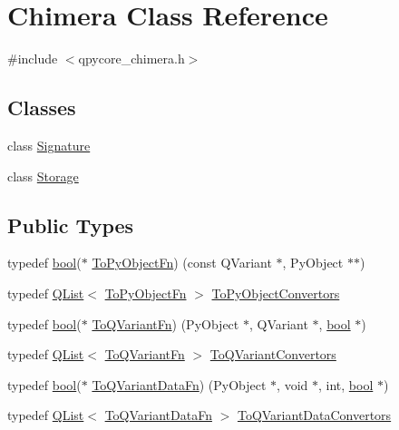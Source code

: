 \hypertarget{classChimera}{}\section{Chimera Class Reference}
\label{classChimera}


{\ttfamily \#include $<$qpycore\+\_\+chimera.\+h$>$}

\subsection*{Classes}
\begin{DoxyCompactItemize}
\item 
class \hyperlink{classChimera_1_1Signature}{Signature}
\item 
class \hyperlink{classChimera_1_1Storage}{Storage}
\end{DoxyCompactItemize}
\subsection*{Public Types}
\begin{DoxyCompactItemize}
\item 
typedef \hyperlink{compiler_8h_abb452686968e48b67397da5f97445f5b}{bool}($\ast$ \hyperlink{classChimera_a056918a401ce0fb2fc5f0b46a8eb6967}{To\+Py\+Object\+Fn}) (const Q\+Variant $\ast$, Py\+Object $\ast$$\ast$)
\item 
typedef \hyperlink{classQList}{Q\+List}$<$ \hyperlink{classChimera_a056918a401ce0fb2fc5f0b46a8eb6967}{To\+Py\+Object\+Fn} $>$ \hyperlink{classChimera_a2ee1210a664f0d28e5220b5055c8386a}{To\+Py\+Object\+Convertors}
\item 
typedef \hyperlink{compiler_8h_abb452686968e48b67397da5f97445f5b}{bool}($\ast$ \hyperlink{classChimera_aace3d67d11685db3bae5e5b2ee733cfb}{To\+Q\+Variant\+Fn}) (Py\+Object $\ast$, Q\+Variant $\ast$, \hyperlink{compiler_8h_abb452686968e48b67397da5f97445f5b}{bool} $\ast$)
\item 
typedef \hyperlink{classQList}{Q\+List}$<$ \hyperlink{classChimera_aace3d67d11685db3bae5e5b2ee733cfb}{To\+Q\+Variant\+Fn} $>$ \hyperlink{classChimera_a626f5f4e5792ee128819ed589df4a004}{To\+Q\+Variant\+Convertors}
\item 
typedef \hyperlink{compiler_8h_abb452686968e48b67397da5f97445f5b}{bool}($\ast$ \hyperlink{classChimera_a5c642e88eaf111610ca6e7c946bb2f7d}{To\+Q\+Variant\+Data\+Fn}) (Py\+Object $\ast$, void $\ast$, int, \hyperlink{compiler_8h_abb452686968e48b67397da5f97445f5b}{bool} $\ast$)
\item 
typedef \hyperlink{classQList}{Q\+List}$<$ \hyperlink{classChimera_a5c642e88eaf111610ca6e7c946bb2f7d}{To\+Q\+Variant\+Data\+Fn} $>$ \hyperlink{classChimera_a978cb277f1825535a81d9646adb17280}{To\+Q\+Variant\+Data\+Convertors}
\end{DoxyCompactItemize}
